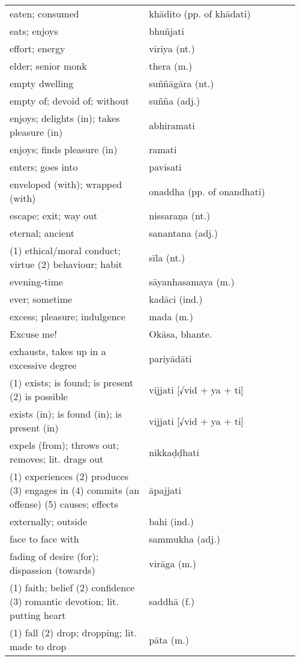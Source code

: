 \documentclass[a5paper]{memoir}
\begin{document}
\begin{longtable}{L{0.48\linewidth} L{0.48\linewidth} H}
eaten; consumed & khādito (pp. of khādati) & \\[0pt]
eats; enjoys & bhuñjati & \\[0pt]
effort; energy & viriya (nt.) & \\[0pt]
elder; senior monk & thera (m.) & \\[0pt]
empty dwelling & suññāgāra (nt.) & \\[0pt]
empty of; devoid of; without & suñña (adj.) & \\[0pt]
enjoys; delights (in); takes pleasure (in) & abhiramati & \\[0pt]
enjoys; finds pleasure (in) & ramati & \\[0pt]
enters; goes into & pavisati & \\[0pt]
enveloped (with); wrapped (with) & onaddha (pp. of onandhati) & \\[0pt]
escape; exit; way out & nissaraṇa (nt.) & \\[0pt]
eternal; ancient & sanantana (adj.) & \\[0pt]
(1) ethical/moral conduct; virtue (2) behaviour; habit & sīla (nt.) & \\[0pt]
evening-time & sāyanhasamaya (m.) & \\[0pt]
ever; sometime & kadāci (ind.) & \\[0pt]
excess; pleasure; indulgence & mada (m.) & \\[0pt]
Excuse me! & Okāsa, bhante. & \\[0pt]
exhausts, takes up in a excessive degree & pariyādāti & \\[0pt]
(1) exists; is found; is present (2) is possible & vijjati [√vid + ya + ti] & \\[0pt]
exists (in); is found (in); is present (in) & vijjati [√vid + ya + ti] & \\[0pt]
expels (from); throws out; removes; lit. drags out & nikkaḍḍhati & \\[0pt]
(1) experiences (2) produces (3) engages in (4) commits (an offense) (5) causes; effects & āpajjati & \\[0pt]
externally; outside & bahi (ind.) & \\[0pt]
face to face with & sammukha (adj.) & \\[0pt]
fading of desire (for); dispassion (towards) & virāga (m.) & \\[0pt]
(1) faith; belief (2) confidence (3) romantic devotion; lit. putting heart & saddhā (f.) & \\[0pt]
(1) fall (2) drop; dropping; lit. made to drop & pāta (m.) & \\[0pt]

\end{longtable}
\end{document}
